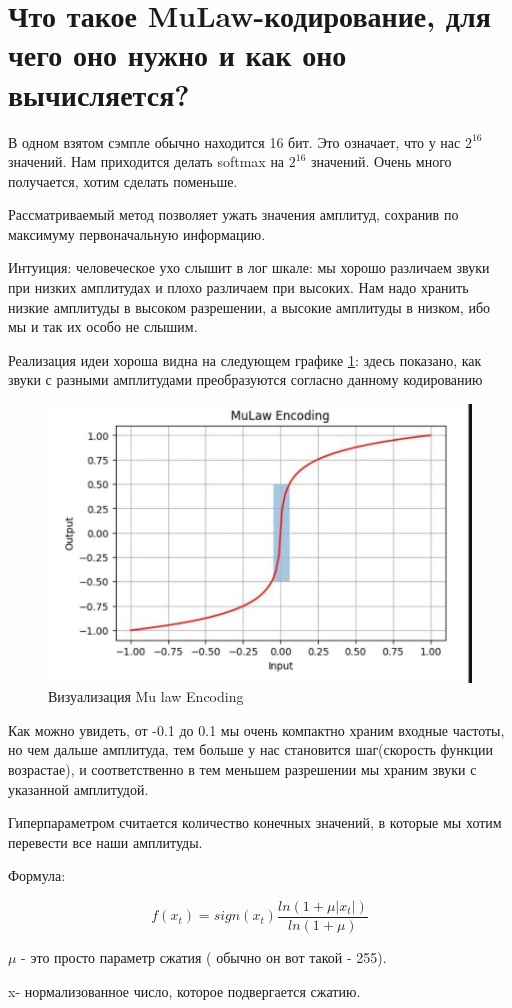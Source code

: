 	\section{Что такое MuLaw-кодирование, для чего оно нужно и как оно вычисляется?}
	
	В одном взятом сэмпле обычно находится 16 бит. Это означает, что у нас $2^{16}$ значений. Нам приходится делать softmax на $2^{16}$ значений. Очень много получается, хотим сделать поменьше. 
	
	Рассматриваемый метод позволяет ужать значения амплитуд, сохранив по максимуму первоначальную информацию. 
	
	Интуиция: человеческое ухо слышит в лог шкале: мы хорошо различаем звуки при низких амплитудах и плохо различаем при высоких. Нам надо хранить низкие амплитуды в высоком разрешении, а высокие амплитуды в низком, ибо мы и так их особо не слышим. 
	
	Реализация идеи хороша видна на следующем графике \ref{fig:12_plot}: здесь показано, как звуки с разными амплитудами преобразуются согласно данному кодированию 
	
	
		\begin{figure}[H]
\centering
\includegraphics[width=0.7\linewidth]{12_trans.jpg}
\caption{Визуализация Mu law Encoding}
\label{fig:12_plot}
\end{figure}

Как можно увидеть, от -0.1 до 0.1 мы очень компактно храним входные частоты, но чем дальше амплитуда, тем больше у нас становится шаг(скорость функции возрастае), и соответственно в тем меньшем разрешении мы храним звуки с указанной амплитудой. 

Гиперпараметром считается количество конечных значений, в которые мы хотим перевести все наши амплитуды. 


Формула:

\begin{equation}

	    f(x_t) = sign(x_t) \dfrac{ln(1+\mu|x_t|)}{ln(1+\mu)}
	    \label{eq:12_formula}
	    \end{equation}
	
$\mu$ - это просто параметр сжатия ( обычно он вот такой - 255). 

x- нормализованное число, которое подвергается сжатию. 
